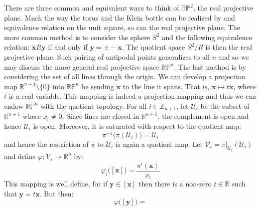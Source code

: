         \begin{example}
            There are three common and equivalent ways to think of
            $\mathbb{RP}^{2}$, the real projective plane. Much the way the
            torus and the Klein bottle can be realized by and equivalence
            relation on the unit square, so can the real projective plane. The
            more common method is to consider the sphere $S^{2}$ and the
            following equivalence relation: $\mathbf{x}R\mathbf{y}$ if and only
            if $\mathbf{y}=\pm\minus\mathbf{x}$. The quotient space
            $S^{2}/R$ is then the real projective plane. Such pairing of
            antipodal points generalizes to all $n$ and so we may discuss the
            more general real projective space $\mathbb{RP}^{n}$. The last
            method is by considering the set of all lines through the origin.
            We can develop a projection map $\mathbb{R}^{n+1}\setminus\{0\}$
            into $\mathbb{RP}^{n}$ be sending $\mathbf{x}$ to the line it spans.
            That is, $\mathbf{x}\mapsto{t}\mathbf{x}$, where $t$ is a real
            variable. This mapping is indeed a projection mapping and thus we
            can endow $\mathbb{RP}^{n}$ with the quotient topology. For all
            $i\in\mathbb{Z}_{n+1}$, let $\mathcal{U}_{i}$ be the subset of
            $\mathbb{R}^{n+1}$ where $x_{i}\ne{0}$. Since lines are closed in
            $\mathbb{R}^{n+1}$, the complement is open and hence
            $\mathcal{U}_{i}$ is open. Moreover, it is saturated with respect to
            the quotient map:
            \begin{equation}
                \pi^{\minus{1}}\big(\pi(\mathcal{U}_{i})\big)=\mathcal{U}_{i}
            \end{equation}
            and hence the restriction of $\pi$ to $\mathcal{U}_{i}$ is again a
            quotient map. Let
            $\mathcal{V}_{i}=\pi|_{\mathcal{U}_{i}}(\mathcal{U}_{i})$ and define
            $\varphi:\mathcal{V}_{i}\rightarrow\mathbb{R}^{n}$ by:
            \begin{equation}
                \varphi_{i}\big([\mathbf{x}]\big)=
                    \frac{\pi^{i}(\mathbf{x})}{x_{i}}
            \end{equation}
            This mapping is well define, for if $\mathbf{y}\in[\mathbf{x}]$ then
            there is a non-zero $t\in\mathbb{R}$ such that
            $\mathbf{y}=t\mathbf{x}$. But then:
            \begin{equation}
                \varphi\big([\mathbf{y}]\big)=

\end{equation}
\end{example}
